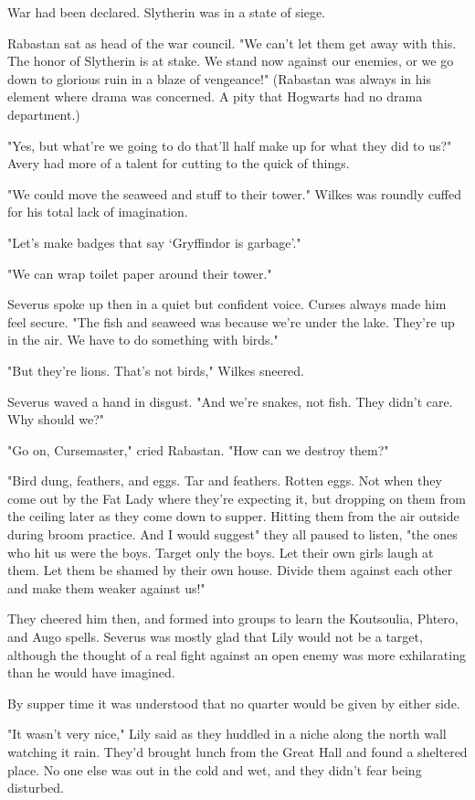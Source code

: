 War had been declared. Slytherin was in a state of siege.

Rabastan sat as head of the war council. "We can't let them get away with this. The honor of Slytherin is at stake. We stand now against our enemies, or we go down to glorious ruin in a blaze of vengeance!" (Rabastan was always in his element where drama was concerned. A pity that Hogwarts had no drama department.)

"Yes, but what're we going to do that'll half make up for what they did to us?" Avery had more of a talent for cutting to the quick of things.

"We could move the seaweed and stuff to their tower." Wilkes was roundly cuffed for his total lack of imagination.

"Let's make badges that say `Gryffindor is garbage'."

"We can wrap toilet paper around their tower."

Severus spoke up then in a quiet but confident voice. Curses always made him feel secure. "The fish and seaweed was because we're under the lake. They're up in the air. We have to do something with birds."

"But they're lions. That's not birds," Wilkes sneered.

Severus waved a hand in disgust. "And we're snakes, not fish. They didn't care. Why should we?"

"Go on, Cursemaster," cried Rabastan. "How can we destroy them?"

"Bird dung, feathers, and eggs. Tar and feathers. Rotten eggs. Not when they come out by the Fat Lady where they're expecting it, but dropping on them from the ceiling later as they come down to supper. Hitting them from the air outside during broom practice. And I would suggest{\el}" they all paused to listen, "the ones who hit us were the boys. Target only the boys. Let their own girls laugh at them. Let them be shamed by their own house. Divide them against each other and make them weaker against us!"

They cheered him then, and formed into groups to learn the Koutsoulia, Phtero, and Augo spells. Severus was mostly glad that Lily would not be a target, although the thought of a real fight against an open enemy was more exhilarating than he would have imagined.

By supper time it was understood that no quarter would be given by either side.

"It wasn't very nice," Lily said as they huddled in a niche along the north wall watching it rain. They'd brought lunch from the Great Hall and found a sheltered place. No one else was out in the cold and wet, and they didn't fear being disturbed.

